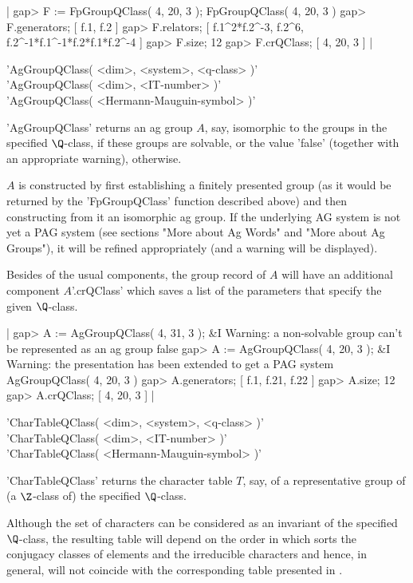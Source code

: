|    gap> F := FpGroupQClass( 4, 20, 3 );
    FpGroupQClass( 4, 20, 3 )
    gap> F.generators;
    [ f.1, f.2 ]
    gap> F.relators;
    [ f.1^2*f.2^-3, f.2^6, f.2^-1*f.1^-1*f.2*f.1*f.2^-4 ]
    gap> F.size;
    12
    gap> F.crQClass;
    [ 4, 20, 3 ] |

\vspace{5mm}
'AgGroupQClass( <dim>, <system>, <q-class> )'%
 \\
'AgGroupQClass( <dim>, <IT-number> )' \\
'AgGroupQClass( <Hermann-Mauguin-symbol> )'

'AgGroupQClass' returns an ag group $A$, say, isomorphic to the groups in
the specified  $\Q$-class,  if these  groups are  solvable,  or the value
'false' (together with an appropriate warning), otherwise.

$A$  is constructed by first  establishing a finitely presented group (as
it would be returned by the 'FpGroupQClass' function described above) and
then  constructing  from it  an isomorphic  ag group.  If the  underlying
AG system is not yet a PAG system (see sections "More about Ag Words" and
"More about Ag Groups"),  it will be refined appropriately (and a warning
will be displayed).

Besides of the  usual components, the group   record of $A$  will have an
additional component  $A$'.crQClass' which saves a list of the parameters
that specify the given $\Q$-class.

|    gap> A := AgGroupQClass( 4, 31, 3 );
    &I  Warning: a non-solvable group can't be represented as an ag group
    false
    gap> A := AgGroupQClass( 4, 20, 3 );
    &I  Warning: the presentation has been extended to get a PAG system
    AgGroupQClass( 4, 20, 3 )
    gap> A.generators;
    [ f.1, f.21, f.22 ]
    gap> A.size;
    12
    gap> A.crQClass;
    [ 4, 20, 3 ] |

\vspace{5mm}
'CharTableQClass( <dim>, <system>, <q-class> )'%
 \\
'CharTableQClass( <dim>, <IT-number> )' \\
'CharTableQClass( <Hermann-Mauguin-symbol> )'

'CharTableQClass'   returns   the   character    table   $T$,  say,  of a
representative group of (a $\Z$-class of) the specified $\Q$-class.

Although the set of characters  can be considered as  an invariant of the
specified $\Q$-class,  the resulting  table  will depend on  the order in
which {\GAP} sorts the conjugacy classes of  elements and the irreducible
characters  and    hence,  in  general,   will  not   coincide  with  the
corresponding table presented in \cite{BBNWZ78}.

